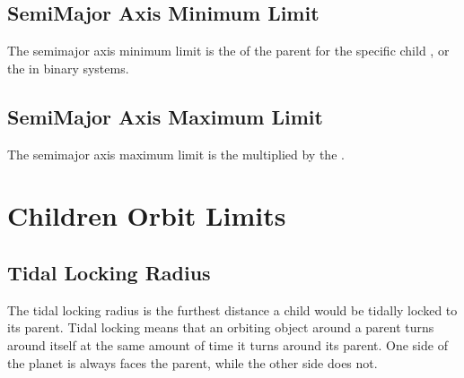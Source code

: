 \documentclass[letterpaper,10pt,english]{sphinxmanual}
\begin{document}
\subsection{Semi\sphinxhyphen{}Major Axis Minimum Limit}
\label{\detokenize{quantities/orbital/semi_major_axis_minimum_limit:semi-major-axis-minimum-limit}}\label{\detokenize{quantities/orbital/semi_major_axis_minimum_limit::doc}}\label{\detokenize{quantities/orbital/semi_major_axis_minimum_limit:id1}}
\sphinxAtStartPar
The semi\sphinxhyphen{}major axis minimum limit is the {\hyperref[\detokenize{quantities/children_orbit_limits/roche_limit:id1}]{}} of the parent for the specific child
{\hyperref[\detokenize{quantities/material/density:id1}]{}}, or the {\hyperref[\detokenize{quantities/children_orbit_limits/p_type_critical_orbit:p-type-critical-orbit}]{}} in binary systems.


\subsection{Semi\sphinxhyphen{}Major Axis Maximum Limit}
\label{\detokenize{quantities/orbital/semi_major_axis_maximum_limit:semi-major-axis-maximum-limit}}\label{\detokenize{quantities/orbital/semi_major_axis_maximum_limit::doc}}\label{\detokenize{quantities/orbital/semi_major_axis_maximum_limit:id1}}
\sphinxAtStartPar
The semi\sphinxhyphen{}major axis maximum limit is the {\hyperref[\detokenize{quantities/children_orbit_limits/hill_sphere:id1}]{}} multiplied by the
{\hyperref[\detokenize{quantities/orbital/orbit_type_factor:id1}]{}}.


\section{Children Orbit Limits}
\label{\detokenize{quantities/children_orbit_limits/children_orbit_limits:children-orbit-limits}}\label{\detokenize{quantities/children_orbit_limits/children_orbit_limits::doc}}\label{\detokenize{quantities/children_orbit_limits/children_orbit_limits:id1}}

\subsection{Tidal Locking Radius}
\label{\detokenize{quantities/children_orbit_limits/tidal_locking_radius:tidal-locking-radius}}\label{\detokenize{quantities/children_orbit_limits/tidal_locking_radius::doc}}\label{\detokenize{quantities/children_orbit_limits/tidal_locking_radius:id1}}
\sphinxAtStartPar
The tidal locking radius is the furthest distance a child would be tidally locked
to its parent. Tidal locking means that an orbiting object around a parent turns
around itself at the same amount of time it turns around its parent.
One side of the planet is always faces the parent, while the other side
does not.
\end{document}
